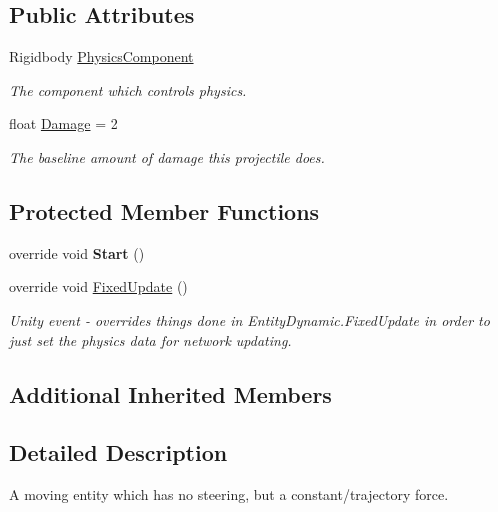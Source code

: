 \subsection*{Public Attributes}
\begin{DoxyCompactItemize}
\item 
Rigidbody \hyperlink{class_skyrates_1_1_client_1_1_entity_1_1_entity_projectile_a9baba166e8c5256933566b23ad721ee5}{Physics\-Component}
\begin{DoxyCompactList}\small\item\em The component which controls physics. \end{DoxyCompactList}\item 
float \hyperlink{class_skyrates_1_1_client_1_1_entity_1_1_entity_projectile_aa09aa0ced7e7d7eec319451f96c5e522}{Damage} = 2
\begin{DoxyCompactList}\small\item\em The baseline amount of damage this projectile does. \end{DoxyCompactList}\end{DoxyCompactItemize}
\subsection*{Protected Member Functions}
\begin{DoxyCompactItemize}
\item 
\hypertarget{class_skyrates_1_1_client_1_1_entity_1_1_entity_projectile_a11a354ca45f188565008690c78076c7c}{override void {\bfseries Start} ()}\label{class_skyrates_1_1_client_1_1_entity_1_1_entity_projectile_a11a354ca45f188565008690c78076c7c}

\item 
override void \hyperlink{class_skyrates_1_1_client_1_1_entity_1_1_entity_projectile_a133cbdcfc84890bec2532f87561838a3}{Fixed\-Update} ()
\begin{DoxyCompactList}\small\item\em Unity event -\/ overrides things done in Entity\-Dynamic.\-Fixed\-Update in order to just set the physics data for network updating. \end{DoxyCompactList}\end{DoxyCompactItemize}
\subsection*{Additional Inherited Members}


\subsection{Detailed Description}
A moving entity which has no steering, but a constant/trajectory force. 



